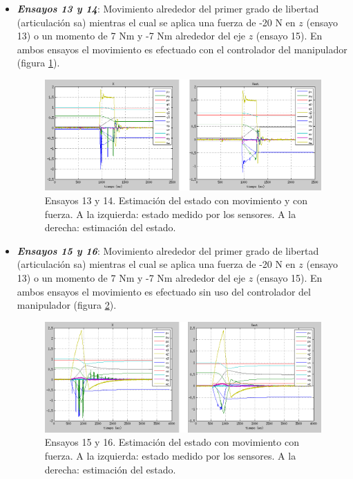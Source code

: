 \begin{itemize}

\item \textbf{\emph{Ensayos 13 y 14}}: Movimiento alrededor del primer grado de libertad (articulación \acrshort{sa}) mientras el cual se aplica una fuerza de -20 N en $z$ (ensayo 13) o un momento de 7 Nm y -7 Nm alrededor del eje $z$ (ensayo 15). En ambos ensayos el movimiento es efectuado con el controlador del manipulador (figura \ref{fig:cmcf-X}).

\begin{figure}[h!]
\centering
\includegraphics[scale=0.4]{Figuras/cmcf-X}
\caption[Ensayos 13 y 14. Estimación del estado con movimiento y con fuerza]{Ensayos 13 y 14. Estimación del estado con movimiento y con fuerza. A la izquierda: estado medido por los sensores. A la derecha: estimación del estado.}
\label{fig:cmcf-X}
\end{figure}

\item \textbf{\emph{Ensayos 15 y 16}}: Movimiento alrededor del primer grado de libertad (articulación \acrshort{sa}) mientras el cual se aplica una fuerza de -20 N en $z$ (ensayo 13) o un momento de 7 Nm y -7 Nm alrededor del eje $z$ (ensayo 15). En ambos ensayos el movimiento es efectuado sin uso del controlador del manipulador (figura \ref{fig:cmcf-Xsc}).

\begin{figure}[h!]
\centering
\includegraphics[scale=0.4]{Figuras/cmcf-Xsc}
\caption[Ensayo 15 y 16. Estimación del estado con movimiento con fuerza]{Ensayos 15 y 16. Estimación del estado con movimiento con fuerza. A la izquierda: estado medido por los sensores. A la derecha: estimación del estado.}
\label{fig:cmcf-Xsc}
\end{figure}

\end{itemize}

